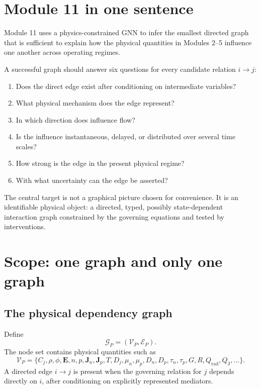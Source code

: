 \documentclass[11pt]{article}
\newcommand{\Gcal}{\mathcal{G}}
\newcommand{\Vcal}{\mathcal{V}}
\newcommand{\Ecal}{\mathcal{E}}
\newcommand{\Evec}{\bm{E}}
\newcommand{\Jvec}{\bm{J}}
\begin{document}
\section{Module 11 in one sentence}

Module 11 uses a physics-constrained GNN to infer the smallest directed graph that is sufficient to explain how the physical quantities in Modules 2--5 influence one another across operating regimes.

A successful graph should answer six questions for every candidate relation \(i\rightarrow j\):
\begin{enumerate}[leftmargin=1.6em]
    \item Does the direct edge exist after conditioning on intermediate variables?
    \item What physical mechanism does the edge represent?
    \item In which direction does influence flow?
    \item Is the influence instantaneous, delayed, or distributed over several time scales?
    \item How strong is the edge in the present physical regime?
    \item With what uncertainty can the edge be asserted?
\end{enumerate}

\begin{physicsbox}
The central target is not a graphical picture chosen for convenience. It is an identifiable physical object: a directed, typed, possibly state-dependent interaction graph constrained by the governing equations and tested by interventions.
\end{physicsbox}

\section{Scope: one graph and only one graph}

\subsection{The physical dependency graph}

Define
\begin{equation}
\Gcal_P=(\Vcal_P,\Ecal_P).
\end{equation}
The node set contains physical quantities such as
\begin{equation}
\Vcal_P=\{C_j,\rho,\phi,\Evec,n,p,\Jvec_n,\Jvec_p,T,D_j,\mu_n,\mu_p,D_n,D_p,\tau_n,\tau_p,G,R,Q_{\mathrm{rad}},Q_{\mathrm{J}},\ldots\}.
\end{equation}
A directed edge \(i\rightarrow j\) is present when the governing relation for \(j\) depends directly on \(i\), after conditioning on explicitly represented mediators.
\end{document}
